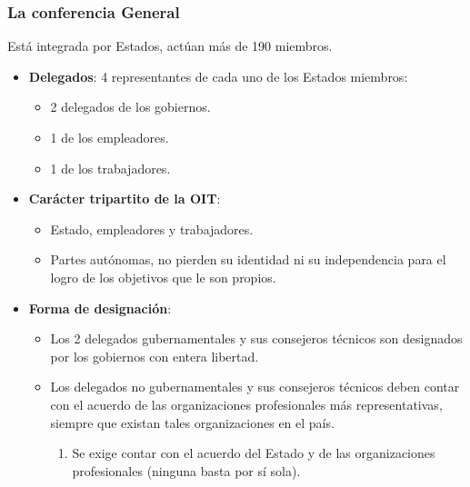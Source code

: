 \documentclass[spanish,12pt,a4paper,titlepage]{report}
\begin{document}
\subsubsection{La conferencia General}
\label{sec:la-conferencia-general}

Está integrada por Estados, actúan más de 190 miembros.

\begin{itemize}
\item \textbf{Delegados}: 4 representantes de cada uno de los Estados miembros:
  \begin{itemize}
  \item 2 delegados de los gobiernos.
  \item 1 de los empleadores.
  \item 1 de los trabajadores.
  \end{itemize}
\item  \textbf{Carácter tripartito de la OIT}:
  \begin{itemize}
  \item Estado, empleadores y trabajadores.
  \item Partes autónomas, no pierden su identidad ni su independencia para el logro de los objetivos que le son propios.
  \end{itemize}
\item \textbf{Forma de designación}:\\
  \begin{itemize}
  \item Los 2 delegados gubernamentales y sus consejeros técnicos son designados por los gobiernos con entera libertad.
  \item Los delegados no gubernamentales y sus consejeros técnicos deben contar con el acuerdo de las organizaciones profesionales más representativas, siempre que existan tales organizaciones en el país.
  \begin{enumerate}
  \item Se exige contar con el acuerdo del Estado y de las organizaciones profesionales (ninguna basta por sí sola).


\end{enumerate}
\end{itemize}
\end{itemize}
\end{document}
